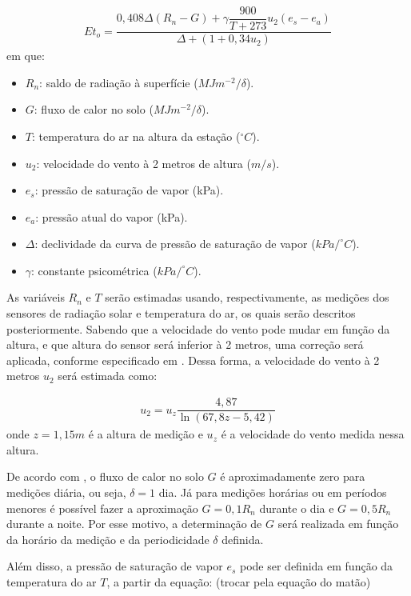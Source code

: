			\begin{eqnarray}
			Et_{o}=\dfrac {0,408\Delta\left( R_{n}-G\right) +\gamma \dfrac {900}{T+273}u_2\left( e_{s}-e_{a}\right) }{\Delta +\left( 1+0,34u_2\right) }
			\end{eqnarray}
			em que:
			\begin{itemize}
				\renewcommand{\labelitemi}{$\Rightarrow$}
				\item $R_n$: saldo de radiação à superfície ($MJ m^{-2}/\delta$).
				\item $G$: fluxo de calor no solo ($MJ m^{-2}/\delta$).
				\item $T$: temperatura do ar na altura da estação ($^{\circ}C$).
				\item $u_2$: velocidade do vento à 2 metros de altura ($m/s$).
				\item $e_s$: pressão de saturação de vapor (kPa).
				\item $e_a$: pressão atual do vapor (kPa).
				\item $\Delta$: declividade da curva de pressão de saturação de vapor ($kPa/^{\circ}C$).
				\item $\gamma$: constante psicométrica ($kPa/^{\circ}C$).
			\end{itemize}
			
			As variáveis $R_n$ e $T$ serão estimadas usando, respectivamente, as medições dos sensores de radiação solar e temperatura do ar, os quais serão descritos posteriormente. Sabendo que a velocidade do vento pode mudar em função da altura, e que altura do sensor será inferior à 2 metros, uma correção será aplicada, conforme especificado em \cite{bib_sen_08_victor}. Dessa forma, a velocidade do vento à 2 metros $u_2$ será estimada como:

			\begin{eqnarray}
				u_2 = u_{z}\dfrac {4,87}{\ln \left( 67,8z-5,42\right)}
			\end{eqnarray}
			onde $z = 1,15m$ é a altura de medição e $u_z$ é a velocidade do vento medida nessa altura.

			De acordo com \cite{bib_sen_08_victor}, o fluxo de calor no solo $G$ é aproximadamente zero para medições diária, ou seja, $\delta = 1$ dia. Já para medições horárias ou em períodos menores é possível fazer a aproximação $G=0,1 R_n$ durante o dia e $G=0,5 R_n$ durante a noite. Por esse motivo, a determinação de $G$ será realizada em função da horário da medição e da periodicidade $\delta$ definida.
 
			Além disso, a pressão de saturação de vapor $e_s$ pode ser definida em função da temperatura do ar $T$, a partir da equação: (trocar pela equação do matão)


